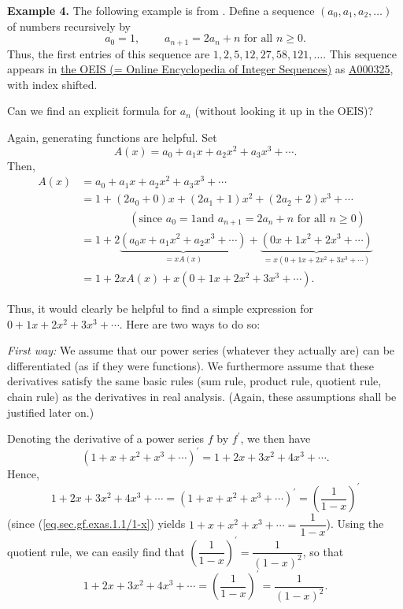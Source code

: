 \textbf{Example 4.} The following example is from \cite[\S 1.2]{Wilf04}.
Define a sequence $\left(  a_{0},a_{1},a_{2},\ldots\right)  $ of numbers
recursively by%
\[
a_{0}=1,\ \ \ \ \ \ \ \ \ \ a_{n+1}=2a_{n}+n\text{ for all }n\geq0.
\]
Thus, the first entries of this sequence are $1,2,5,12,27,58,121,\ldots$. This
sequence appears in \href{https://oeis.org/}{the OEIS (= Online Encyclopedia
of Integer Sequences)} as \href{https://oeis.org/A000325}{A000325}, with index shifted.

Can we find an explicit formula for $a_{n}$ (without looking it up in the OEIS)?

Again, generating functions are helpful. Set%
\[
A\left(  x\right)  =a_{0}+a_{1}x+a_{2}x^{2}+a_{3}x^{3}+\cdots.
\]
Then,%
\begin{align}
A\left(  x\right)   &  =a_{0}+a_{1}x+a_{2}x^{2}+a_{3}x^{3}+\cdots\nonumber\\
&  =1+\left(  2a_{0}+0\right)  x+\left(  2a_{1}+1\right)  x^{2}+\left(
2a_{2}+2\right)  x^{3}+\cdots\nonumber\\
&  \ \ \ \ \ \ \ \ \ \ \ \ \ \ \ \ \ \ \ \ \left(  \text{since }a_{0}=1\text{
and }a_{n+1}=2a_{n}+n\text{ for all }n\geq0\right) \nonumber\\
&  =1+2\underbrace{\left(  a_{0}x+a_{1}x^{2}+a_{2}x^{3}+\cdots\right)
}_{=xA\left(  x\right)  }+\underbrace{\left(  0x+1x^{2}+2x^{3}+\cdots\right)
}_{=x\left(  0+1x+2x^{2}+3x^{3}+\cdots\right)  }\nonumber\\
&  =1+2xA\left(  x\right)  +x\left(  0+1x+2x^{2}+3x^{3}+\cdots\right)  .
\label{eq.sec.gf.exas.4.Ax=1}%
\end{align}


Thus, it would clearly be helpful to find a simple expression for
$0+1x+2x^{2}+3x^{3}+\cdots$. Here are two ways to do so: \medskip

\textit{First way:} We assume that our power series (whatever they actually
are) can be differentiated (as if they were functions). We furthermore assume
that these derivatives satisfy the same basic rules (sum rule, product rule,
quotient rule, chain rule) as the derivatives in real analysis. (Again, these
assumptions shall be justified later on.)

Denoting the derivative of a power series $f$ by $f^{\prime}$, we then have%
\[
\left(  1+x+x^{2}+x^{3}+\cdots\right)  ^{\prime}=1+2x+3x^{2}+4x^{3}+\cdots.
\]
Hence,%
\[
1+2x+3x^{2}+4x^{3}+\cdots=\left(  1+x+x^{2}+x^{3}+\cdots\right)  ^{\prime
}=\left(  \dfrac{1}{1-x}\right)  ^{\prime}%
\]
(since (\ref{eq.sec.gf.exas.1.1/1-x}) yields $1+x+x^{2}+x^{3}+\cdots=\dfrac
{1}{1-x}$). Using the quotient rule, we can easily find that $\left(
\dfrac{1}{1-x}\right)  ^{\prime}=\dfrac{1}{\left(  1-x\right)  ^{2}}$, so that%
\begin{equation}
1+2x+3x^{2}+4x^{3}+\cdots=\left(  \dfrac{1}{1-x}\right)  ^{\prime}=\dfrac
{1}{\left(  1-x\right)  ^{2}}. \label{eq.sec.gf.exas.4.1/(1-x)2}%
\end{equation}


